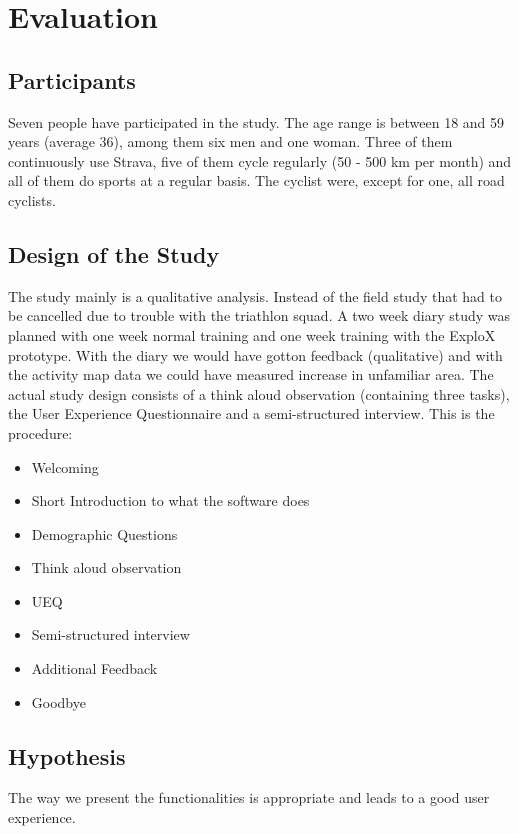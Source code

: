 \documentclass{sigchi}
\begin{document}
\section{Evaluation}

\subsection{Participants}
Seven people have participated in the study. The age range is between 18 and 59 years (average 36), among them six men and one woman. Three of them continuously use Strava, five of them cycle regularly (50 - 500 km per month) and all of them do sports at a regular basis. The cyclist were, except for one, all road cyclists.

\subsection{Design of the Study}
The study mainly is a qualitative analysis. Instead of the field study that had to be cancelled due to trouble with the triathlon squad. A two week diary study was planned with one week normal training and one week training with the ExploX prototype. With the diary we would have gotton feedback (qualitative) and with the activity map data we could have measured increase in unfamiliar area.
The actual study design consists of a think aloud observation (containing three tasks), the User Experience Questionnaire and a semi-structured interview. 
This is the procedure:
\begin{itemize}
\item Welcoming
\item Short Introduction to what the software does
\item Demographic Questions
\item Think aloud observation
\item UEQ
\item Semi-structured interview
\item Additional Feedback
\item Goodbye
\end{itemize}

\subsection{Hypothesis}
The way we present the functionalities is appropriate and leads to a good user experience.
\end{document}

